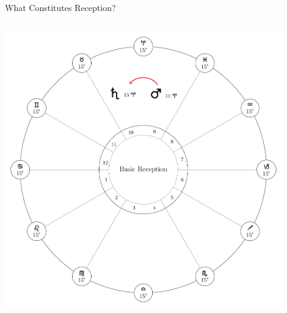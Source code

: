 \begin{frame}[t]{What Constitutes Reception?}
\begin{columns}[T, onlytextwidth]
\vspace{-0.5cm}
\begin{center}
{\includegraphics[width=0.9\textwidth]{charts/01-A-receives}} \\
\end{center}

\end{columns}
\vspace{0.2cm}
\end{frame}
